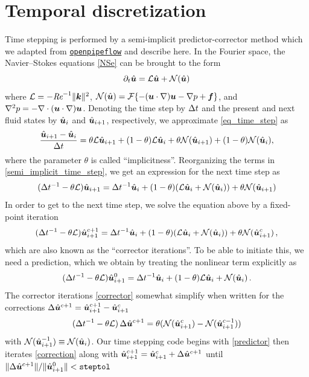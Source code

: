\documentclass[a4paper, 11pt]{article}
\begin{document}
\section{Temporal discretization}

Time stepping is performed by a semi-implicit predictor-corrector method which we
adapted from \href{openpipeflow.org}{\texttt{openpipeflow}} \cite{willis2017openpipeflow} 
and describe here. In the Fourier space, the Navier--Stokes equations 
\cref{NSe} can be brought to the form 
\begin{equation}
    \partial_t \hat{\bm{u}} = \mathcal{L} \hat{\bm{u}} + \mathcal{N} (\hat{\bm{u}}) \label{eq_time_step}
\end{equation}
where $\mathcal{L} = - \textit{Re}^{-1} \|\bm{k}\|^2 $, 
$\mathcal{N} (\hat{\bm{u}}) = \mathcal{F}\{ -(\bm{u} \cdot \nabla) \bm{u} - \nabla p + \bm{f} \}$, 
and $\nabla^2 p = -\nabla \cdot (\bm{u} \cdot \nabla) \bm{u}$. 
Denoting the time step by $\Delta t$ and 
the present and next fluid states 
by $\hat{\bm{u}}_i$ and $\hat{\bm{u}}_{i + 1}$, respectively, 
we approximate \cref{eq_time_step} as 
\begin{equation}
    \frac{\hat{\bm{u}}_{i+1} - \hat{\bm{u}}_i}{\Delta t} 
    = \theta \mathcal{L}  \hat{\bm{u}}_{i+1}  + (1 - \theta) \mathcal{L}  \hat{\bm{u}}_i
    + \theta \mathcal{N} (\hat{\bm{u}}_{i+1}) + (1 - \theta) \mathcal{N} (\hat{\bm{u}}_i) ,
    \label{semi_implicit_time_step}
\end{equation}
where the parameter $\theta$ is called ``implicitness''. 
Reorganizing the terms in \cref{semi_implicit_time_step}, we get an 
expression for the next time step as 
\begin{equation}
   (\Delta t^{-1} - \theta \mathcal{L} ) \hat{\bm{u}}_{i+1} = 
    \Delta t^{-1} \hat{\bm{u}}_i +  (1 - \theta) (\mathcal{L}  \hat{\bm{u}}_i + \mathcal{N} (\hat{\bm{u}}_i)) + \theta \mathcal{N} (\hat{\bm{u}}_{i+1})
    \label{state_next}
\end{equation}
In order to get to the next time step, we solve the equation above by a fixed-point iteration
\begin{equation}
    (\Delta t^{-1} - \theta \mathcal{L} ) \hat{\bm{u}}_{i+1}^{c+1} = 
    \Delta t^{-1} \hat{\bm{u}}_i 
    +  (1 - \theta) (\mathcal{L}  \hat{\bm{u}}_i 
    + \mathcal{N} (\hat{\bm{u}}_i)) + \theta \mathcal{N} (\hat{\bm{u}}_{i+1}^{c}) \,, \label{corrector}
\end{equation}
which are also known as the ``corrector iterations''. To be able to initiate this, we need 
a prediction, which we obtain by treating the nonlinear term explicitly as
\begin{equation}
    (\Delta t^{-1} - \theta \mathcal{L} ) \hat{\bm{u}}_{i+1}^0 = 
    \Delta t^{-1} \hat{\bm{u}}_i +  (1 - \theta) \mathcal{L}  \hat{\bm{u}}_i + \mathcal{N} (\hat{\bm{u}}_i) \,. \label{predictor}
\end{equation}
The corrector iterations \cref{corrector} somewhat simplify when written for the 
corrections $\Delta \hat{\bm{u}}^{c + 1} = \hat{\bm{u}}_{i+1}^{c+1} - \hat{\bm{u}}_{i+1}^{c}$
\begin{equation}
    (\Delta t^{-1} - \theta \mathcal{L} )\, \Delta \hat{\bm{u}}^{c + 1} =  
    \theta ( \mathcal{N} (\hat{\bm{u}}_{i + 1}^{c}) - \mathcal{N} (\hat{\bm{u}}_{i + 1}^{c - 1}) ) \label{correction}
\end{equation}
with $\mathcal{N} (\hat{\bm{u}}_{i + 1}^{- 1}) \equiv  \mathcal{N} (\hat{\bm{u}}_{i})$. Our time stepping code begins 
with \cref{predictor} then iterates \cref{correction} along with 
$\hat{\bm{u}}_{i+1}^{c+1} = \hat{\bm{u}}_{i+1}^{c} + \Delta \hat{\bm{u}}^{c + 1}$ until
$\| \Delta \hat{\bm{u}}^{c + 1} \| / \| \hat{\bm{u}}_{i + 1}^{0} \| < \mbox{\texttt{steptol}}$  
\end{document}
